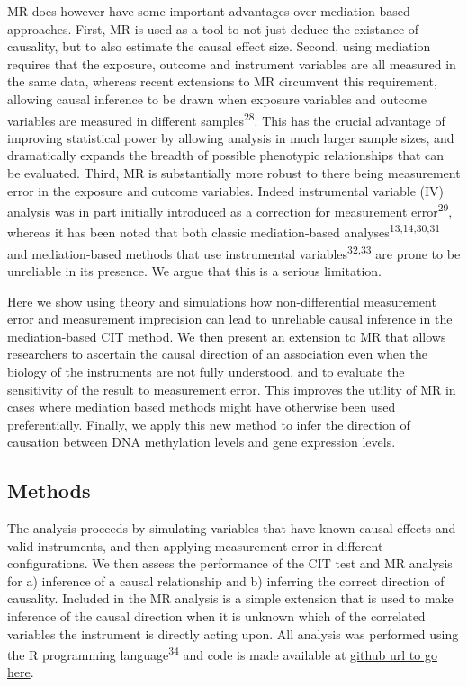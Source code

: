 \documentclass[]{article}
\begin{document}
MR does however have some important advantages over mediation based
approaches. First, MR is used as a tool to not just deduce the existance
of causality, but to also estimate the causal effect size. Second, using
mediation requires that the exposure, outcome and instrument variables
are all measured in the same data, whereas recent extensions to MR
circumvent this requirement, allowing causal inference to be drawn when
exposure variables and outcome variables are measured in different
samples\textsuperscript{28}. This has the crucial advantage of improving
statistical power by allowing analysis in much larger sample sizes, and
dramatically expands the breadth of possible phenotypic relationships
that can be evaluated. Third, MR is substantially more robust to there
being measurement error in the exposure and outcome variables. Indeed
instrumental variable (IV) analysis was in part initially introduced as
a correction for measurement error\textsuperscript{29}, whereas it has
been noted that both classic mediation-based
analyses\textsuperscript{13,14,30,31} and mediation-based methods that
use instrumental variables\textsuperscript{32,33} are prone to be
unreliable in its presence. We argue that this is a serious limitation.

Here we show using theory and simulations how non-differential
measurement error and measurement imprecision can lead to unreliable
causal inference in the mediation-based CIT method. We then present an
extension to MR that allows researchers to ascertain the causal
direction of an association even when the biology of the instruments are
not fully understood, and to evaluate the sensitivity of the result to
measurement error. This improves the utility of MR in cases where
mediation based methods might have otherwise been used preferentially.
Finally, we apply this new method to infer the direction of causation
between DNA methylation levels and gene expression levels.

\subsection{Methods}\label{methods}

The analysis proceeds by simulating variables that have known causal
effects and valid instruments, and then applying measurement error in
different configurations. We then assess the performance of the CIT test
and MR analysis for a) inference of a causal relationship and b)
inferring the correct direction of causality. Included in the MR
analysis is a simple extension that is used to make inference of the
causal direction when it is unknown which of the correlated variables
the instrument is directly acting upon. All analysis was performed using
the R programming language\textsuperscript{34} and code is made
available at \href{}{github url to go here}.
\end{document}
